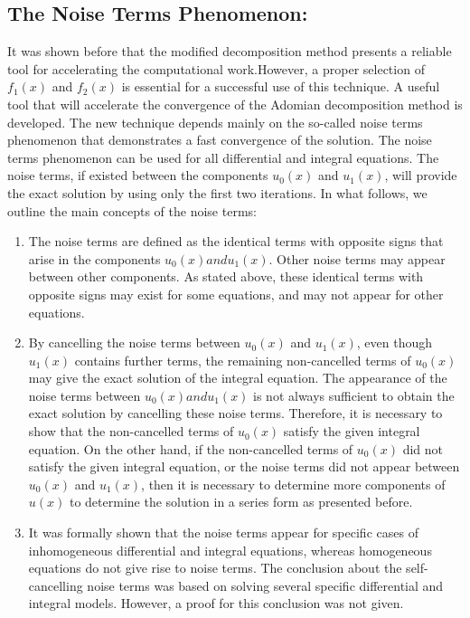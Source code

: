 \documentclass[11pt]{report}
\begin{document}
	\subsection{The Noise Terms Phenomenon:}
	It was shown before that the modified decomposition method presents a reliable tool for accelerating the computational work.However, a proper selection of $f_1(x)$ and $f_2(x)$ is essential for a successful use of this technique. A useful tool that will accelerate the convergence of the Adomian decomposition method is developed. The new technique depends mainly on the so-called noise terms phenomenon that demonstrates a fast convergence of the solution. The noise terms phenomenon can be used for all differential and integral equations. The noise terms, if existed between the components $u_0(x)$ and $u_1(x)$, will provide the exact solution by using only the first two iterations. In what follows, we outline the main concepts of the noise terms:
	\begin{enumerate}
		\item The noise terms are defined as the identical terms with opposite signs that arise in the components $u_0(x) and u_1(x)$. Other noise terms may appear between other components. As stated above, these identical terms with opposite signs may exist for some equations, and may not appear for other equations.
		
		\item  By cancelling the noise terms between $u_0(x)$ and $u_1(x)$, even though $u_1(x)$ contains further terms, the remaining non-cancelled terms of $u_0(x)$ may give the exact solution of the integral equation. The appearance of the noise terms between $u_0(x) and u_1(x)$ is not always sufficient to obtain the exact solution by cancelling these noise terms. Therefore, it is necessary to show that the non-cancelled terms of $u_0(x)$ satisfy the given integral equation. On the other hand, if the non-cancelled terms of $u_0(x)$ did not satisfy the given integral equation, or the noise terms did not appear between $u_0(x)$ and $u_1(x)$, then it is necessary to determine more components of $u(x)$ to determine the solution in a series form as presented before.
		
		\item It was formally shown that the noise terms appear for specific cases of inhomogeneous differential and integral equations, whereas homogeneous equations do not give rise to noise terms. The conclusion about the self-cancelling noise terms was based on solving several specific differential and integral models. However, a proof for this conclusion was not given.
	\end{enumerate}
	
\end{document}

